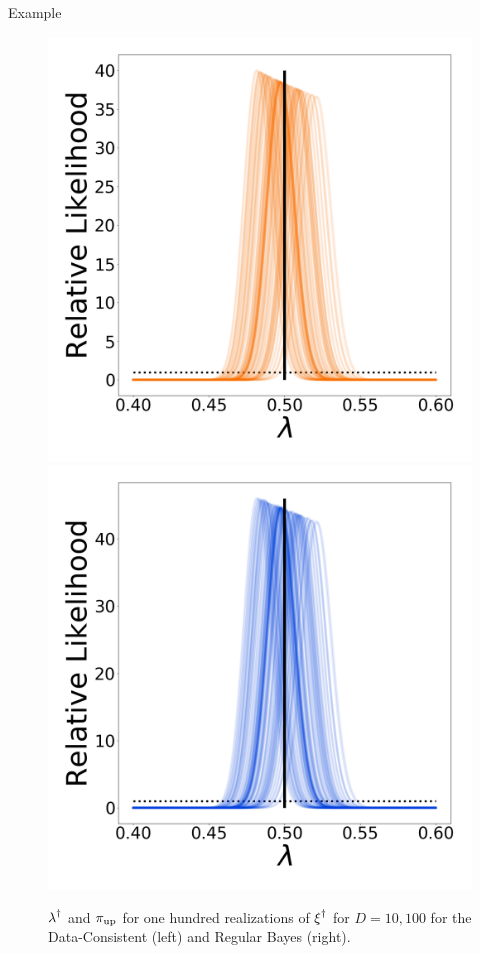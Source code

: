 \begin{block}{Example}
\begin{figure}
        \includegraphics[width=13cm]{figures/updated_stability_D100_sigma-10E-4}
        \includegraphics[width=13cm]{figures/posterior_stability_D100_sigma-10E-4}
        \vspace{-1cm}
        \caption{$\operatorname*{\lambda}^\dagger$ and $\operatorname*{\pi_{up}}$ for one hundred realizations of $\operatorname*{\xi}^\dagger$ for $D=10,100$ for the Data-Consistent (left) and Regular Bayes (right).}
    \end{figure}

\end{block}
